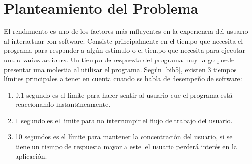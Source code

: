 \section{Planteamiento del Problema}
El rendimiento es uno de los factores más influyentes en la experiencia del usuario al interactuar con software. Consiste principalmente en el tiempo que necesita el programa para responder a algún estímulo o el tiempo que necesita para ejecutar una o varias acciones. Un tiempo de respuesta del programa muy largo puede presentar una molestia al utilizar el programa. Según \ref{bib5}, existen 3 tiempos límites principales a tener en cuenta cuando se habla de desempeño de software:

\begin{enumerate}
    \item 0.1 segundo es el límite para hacer sentir al usuario que el programa está reaccionando instantáneamente.
    \item 1 segundo es el límite para no interrumpir el flujo de trabajo del usuario.
    \item 10 segundos es el límite para mantener la concentración del usuario, si se tiene un tiempo de respuesta mayor a este, el usuario perderá interés en la aplicación.
\end{enumerate}

